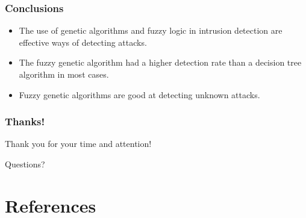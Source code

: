 \documentclass{beamer}
\newcommand{\linespace}{\vskip 0.25cm}
\begin{document}
\begin{frame}
\frametitle{Conclusions}

\begin{itemize}
  \item The use of genetic algorithms and fuzzy logic in intrusion detection are effective ways of detecting attacks.
  \item The fuzzy genetic algorithm had a higher detection rate than a decision tree algorithm in most cases.
  \item Fuzzy genetic algorithms are good at detecting unknown attacks.
\end{itemize}


\end{frame}

\begin{frame}
	\frametitle{Thanks!}
	
	Thank you for your time and attention!
		
	\linespace
	\linespace
	
	\begin{center}
	{\huge Questions?}
	\end{center}
\end{frame}

\section*{References}
\end{document}
